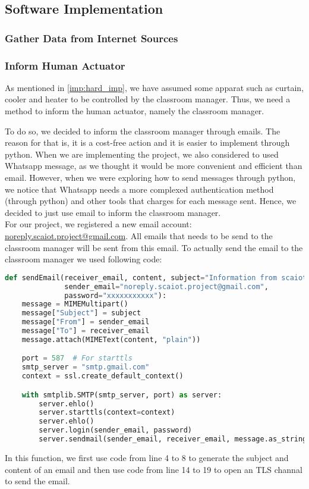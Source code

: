 \documentclass[runningheads]{llncs}
\begin{document}
\subsection{Software Implementation}
\label{imp:soft_imp}

\subsubsection{Gather Data from Internet Sources}\hfill
\label{soft_imp:sensor}
\newline

\subsubsection{Inform Human Actuator}\hfill
\label{soft_imp:actuator}
\newline
As mentioned in \ref{imp:hard_imp}, we have assumed some apparat such as curtain, cooler and heater to be controlled by the classroom manager. Thus, we need a method to inform the human actuator, namely the classroom manager.

To do so, we decided to inform the classroom manager through emails. The reason for that is, it is a cost-free action and it is easier to implement through python. When we are implementing the project, we also considered to used Whatsapp message, as we thought it would be more convenient and efficient than email. However, when we were exploring how to send messages through python, we notice that Whatsapp needs a more complexed authentication method (through python) and other tools that charges for each message sent. Hence, we decided to just use email to inform the classroom manager.\\

For our project, we registered a new email account: \url{noreply.scaiot.project@gmail.com}. All emails that needs to be send to the classroom manager will be sent from this email. To actually send the email to the classroom manager we used following code:
\begin{lstlisting}[language=python]
def sendEmail(receiver_email, content, subject="Information from scaiot project",
              sender_email="noreply.scaiot.project@gmail.com",
              password="xxxxxxxxxxx"):
    message = MIMEMultipart()
    message["Subject"] = subject
    message["From"] = sender_email
    message["To"] = receiver_email
    message.attach(MIMEText(content, "plain"))

    port = 587  # For starttls
    smtp_server = "smtp.gmail.com"
    context = ssl.create_default_context()

    with smtplib.SMTP(smtp_server, port) as server:
        server.ehlo()  
        server.starttls(context=context)
        server.ehlo()  
        server.login(sender_email, password)
        server.sendmail(sender_email, receiver_email, message.as_string())
\end{lstlisting}
In this function, we first use code from line 4 to 8 to generate the subject and content of an email and then use code from line 14 to 19 to open an TLS channal to send the email.
\end{document}
